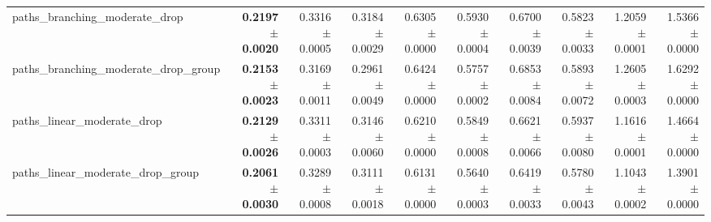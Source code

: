 \begin{tabular}{@{}lrrrrrrrrr@{}}
paths\_branching\_moderate\_drop & \textbf{0.2197 $\pm$ 0.0020} & 0.3316 $\pm$ 0.0005 & 0.3184 $\pm$ 0.0029 & 0.6305 $\pm$ 0.0000 & 0.5930 $\pm$ 0.0004 & 0.6700 $\pm$ 0.0039 & 0.5823 $\pm$ 0.0033 & 1.2059 $\pm$ 0.0001 & 1.5366 $\pm$ 0.0000 \\
paths\_branching\_moderate\_drop\_group & \textbf{0.2153 $\pm$ 0.0023} & 0.3169 $\pm$ 0.0011 & 0.2961 $\pm$ 0.0049 & 0.6424 $\pm$ 0.0000 & 0.5757 $\pm$ 0.0002 & 0.6853 $\pm$ 0.0084 & 0.5893 $\pm$ 0.0072 & 1.2605 $\pm$ 0.0003 & 1.6292 $\pm$ 0.0000 \\
paths\_linear\_moderate\_drop & \textbf{0.2129 $\pm$ 0.0026} & 0.3311 $\pm$ 0.0003 & 0.3146 $\pm$ 0.0060 & 0.6210 $\pm$ 0.0000 & 0.5849 $\pm$ 0.0008 & 0.6621 $\pm$ 0.0066 & 0.5937 $\pm$ 0.0080 & 1.1616 $\pm$ 0.0001 & 1.4664 $\pm$ 0.0000 \\
paths\_linear\_moderate\_drop\_group & \textbf{0.2061 $\pm$ 0.0030} & 0.3289 $\pm$ 0.0008 & 0.3111 $\pm$ 0.0018 & 0.6131 $\pm$ 0.0000 & 0.5640 $\pm$ 0.0003 & 0.6419 $\pm$ 0.0033 & 0.5780 $\pm$ 0.0043 & 1.1043 $\pm$ 0.0002 & 1.3901 $\pm$ 0.0000 \\
\bottomrule
\end{tabular}
